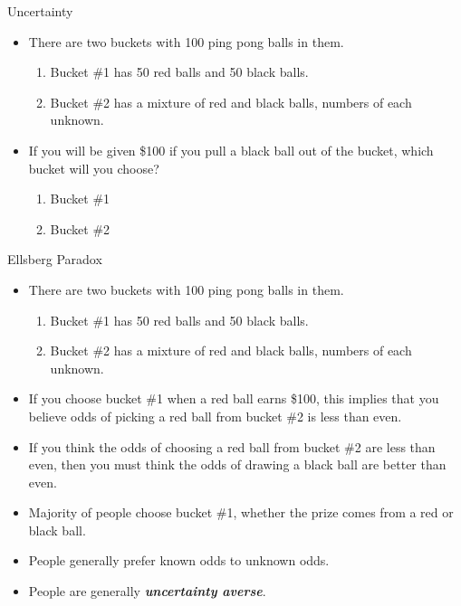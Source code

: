 \begin{frame}{Uncertainty}
	\begin{itemize}
		\item There are two buckets with 100 ping pong balls in them.
		\begin{enumerate}
			\item Bucket \#1 has 50 red balls and 50 black balls.
			\item Bucket \#2 has a mixture of red and black balls, numbers of each unknown.
		\end{enumerate}
		\item If you will be given \$100 if you pull a black ball out of the bucket, which bucket will you choose?
		\begin{enumerate}
			\item Bucket \#1
			\item Bucket \#2
		\end{enumerate}
	\end{itemize}
\end{frame}

\begin{frame}{Ellsberg Paradox}
	\begin{itemize}
		\item There are two buckets with 100 ping pong balls in them.
		\begin{enumerate}
			\item Bucket \#1 has 50 red balls and 50 black balls.
			\item Bucket \#2 has a mixture of red and black balls, numbers of each unknown.
		\end{enumerate}
		\item If you choose bucket \#1 when a red ball earns \$100, this implies that you believe odds of picking a red ball from bucket \#2 is less than even.
		\item If you think the odds of choosing a red ball from bucket \#2 are less than even, then you must think the odds of drawing a black ball are better than even.
		\item Majority of people choose bucket \#1, whether the prize comes from a red or black ball.
		\item People generally prefer known odds to unknown odds.
		\item People are generally \textbf{\textit{uncertainty averse}}.
	\end{itemize}
\end{frame}

